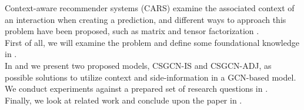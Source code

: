 Context-aware recommender systems (CARS) examine the associated context of an interaction when creating a prediction, and different ways to approach this problem have been proposed, such as matrix and tensor factorization \cite{carsprogress, CAMF}.\\
First of all, we will examine the problem and define some foundational knowledge in .\\
In  and  we present two proposed models, CSGCN-IS and CSGCN-ADJ, as possible solutions to utilize context and side-information in a GCN-based model.
We conduct experiments against a prepared set of research questions in .\\
Finally, we look at related work and conclude upon the paper in .
\\\\
